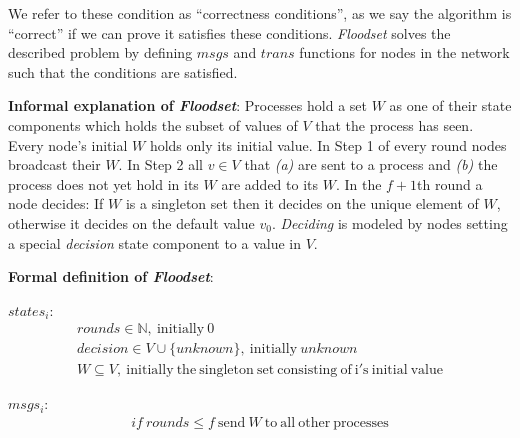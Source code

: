 \documentclass[fleqn]{article}
\begin{document}
We refer to these condition as ``correctness conditions'', as we say the algorithm is ``correct'' if we can prove it satisfies these conditions.  \textit{Floodset} solves the described problem by defining $msgs$ and $trans$ functions for nodes in the network such that the conditions are satisfied.

\textbf{Informal explanation of \textit{Floodset}}: Processes hold a set $W$ as one of their state components which holds the subset of values of $V$ that the process has seen. Every node's initial $W$ holds only its initial value.  In Step 1 of every round nodes broadcast their $W$. In Step 2 all $v \in V$ that \textit{(a)} are sent to a process and \textit{(b)} the process does not yet hold in its $W$ are added to its $W$. In the $f+1$th round a node decides: If $W$ is a singleton set then it decides on the unique element of $W$, otherwise it decides on the default value $v_0$.  \textit{Deciding} is modeled by nodes setting a special \textit{decision} state component to a value in $V$.

\textbf{Formal definition of \textit{Floodset}}:
\begin{mdframed}[nobreak=true, backgroundcolor=light-gray, roundcorner=10pt,leftmargin=1, rightmargin=1, innerleftmargin=15, innertopmargin=15,innerbottommargin=15, outerlinewidth=1, linecolor=light-gray]
\noindent $states_i$:
\begin{gather*}
  rounds   \in  \mathbb{N}, \ \mathrm{initially} \ 0 \\
  decision  \in  V \cup \{ unknown \}, \ \mathrm{initially} \ unknown \\
  W \subseteq V, \ \mathrm{initially \ the\  singleton\  set\  consisting\  of\  i's\  initial\  value}
\end{gather*}
\end{mdframed}

\begin{mdframed}[nobreak=true, backgroundcolor=light-gray, roundcorner=10pt,leftmargin=1, rightmargin=1, innerleftmargin=15, innertopmargin=15,innerbottommargin=15, outerlinewidth=1, linecolor=light-gray]
\noindent $msgs_i$:
\begin{gather*}
  if\ rounds \le f\ \mathrm{send}\ W\ \mathrm{to\ all\ other\ processes}
\end{gather*}
\end{mdframed}
\end{document}
